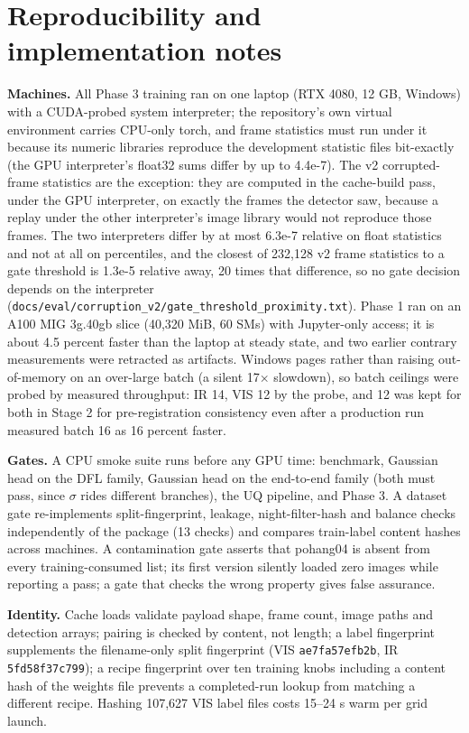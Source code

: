 \documentclass[journal,onecolumn]{IEEEtran}
\begin{document}
\section{Reproducibility and implementation notes}\label{app:I}
\textbf{Machines.} All Phase 3 training ran on one laptop (RTX 4080, 12 GB, Windows) with a CUDA-probed system interpreter; the repository's own virtual environment carries CPU-only torch, and frame statistics must run under it because its numeric libraries reproduce the development statistic files bit-exactly (the GPU interpreter's float32 sums differ by up to 4.4e-7). The v2 corrupted-frame statistics are the exception: they are computed in the cache-build pass, under the GPU interpreter, on exactly the frames the detector saw, because a replay under the other interpreter's image library would not reproduce those frames. The two interpreters differ by at most 6.3e-7 relative on float statistics and not at all on percentiles, and the closest of 232,128 v2 frame statistics to a gate threshold is 1.3e-5 relative away, 20 times that difference, so no gate decision depends on the interpreter (\texttt{docs/\allowbreak{}eval/\allowbreak{}corruption\_\allowbreak{}v2/\allowbreak{}gate\_\allowbreak{}threshold\_\allowbreak{}proximity.txt}). Phase 1 ran on an A100 MIG 3g.40gb slice (40,320 MiB, 60 SMs) with Jupyter-only access; it is about 4.5 percent faster than the laptop at steady state, and two earlier contrary measurements were retracted as artifacts. Windows pages rather than raising out-of-memory on an over-large batch (a silent 17$\times$ slowdown), so batch ceilings were probed by measured throughput: IR 14, VIS 12 by the probe, and 12 was kept for both in Stage 2 for pre-registration consistency even after a production run measured batch 16 as 16 percent faster.

\textbf{Gates.} A CPU smoke suite runs before any GPU time: benchmark, Gaussian head on the DFL family, Gaussian head on the end-to-end family (both must pass, since $\sigma$ rides different branches), the UQ pipeline, and Phase 3. A dataset gate re-implements split-fingerprint, leakage, night-filter-hash and balance checks independently of the package (13 checks) and compares train-label content hashes across machines. A contamination gate asserts that pohang04 is absent from every training-consumed list; its first version silently loaded zero images while reporting a pass; a gate that checks the wrong property gives false assurance.

\textbf{Identity.} Cache loads validate payload shape, frame count, image paths and detection arrays; pairing is checked by content, not length; a label fingerprint supplements the filename-only split fingerprint (VIS \texttt{ae7fa57efb2b}, IR \texttt{5fd58f37c799}); a recipe fingerprint over ten training knobs including a content hash of the weights file prevents a completed-run lookup from matching a different recipe. Hashing 107,627 VIS label files costs 15--24 s warm per grid launch.
\end{document}
